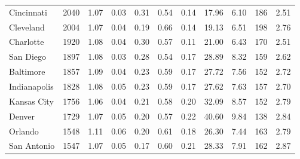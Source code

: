 \documentclass[11pt]{article}
\begin{document}
\begin{table}
\begin{tabular}{p{2.5cm} p{1.5cm} p{1.5cm} p{1.5cm} p{1.55cm} p{1.5cm} p{1.5cm} p{1.5cm} p{1.5cm} p{1.5cm} p{1.5cm}}
	Cincinnati           & 2040          & 1.07         & 0.03                       & 0.31           & 0.54        & 0.14        & 17.96                 & 6.10                  & 186                   & 2.51             \\
	Cleveland            & 2004          & 1.07         & 0.04                       & 0.19           & 0.66        & 0.14        & 19.13                 & 6.51                  & 198                   & 2.76             \\
	Charlotte            & 1920          & 1.08         & 0.04                       & 0.30           & 0.57        & 0.11        & 21.00                 & 6.43                  & 170                   & 2.51             \\
	San Diego            & 1897          & 1.08         & 0.03                       & 0.28           & 0.54        & 0.17        & 28.89                 & 8.32                  & 159                   & 2.62             \\
	Baltimore            & 1857          & 1.09         & 0.04                       & 0.23           & 0.59        & 0.17        & 27.72                 & 7.56                  & 152                   & 2.72             \\
	Indianapolis         & 1828          & 1.08         & 0.05                       & 0.23           & 0.59        & 0.17        & 27.62                 & 7.63                  & 157                   & 2.70             \\
	Kansas City          & 1756          & 1.06         & 0.04                       & 0.21           & 0.58        & 0.20        & 32.09                 & 8.57                  & 152                   & 2.79             \\
	Denver               & 1729          & 1.07         & 0.05                       & 0.20           & 0.57        & 0.22        & 40.60                 & 9.84                  & 138                   & 2.84             \\
	Orlando              & 1548          & 1.11         & 0.06                       & 0.20           & 0.61        & 0.18        & 26.30                 & 7.44                  & 163                   & 2.79             \\
	San Antonio          & 1547          & 1.07         & 0.05                       & 0.17           & 0.60        & 0.21        & 28.33                 & 7.91                  & 162                   & 2.87             \\

\end{tabular}
\end{table}
\end{document}
